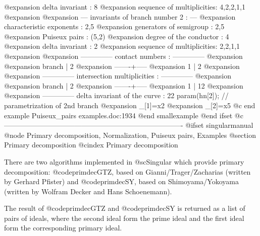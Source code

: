@expansion{}  delta invariant           : 8
@expansion{}  sequence of multiplicities: 4,2,2,1,1
@expansion{} 
@expansion{}  --- invariants of branch number 2 : ---
@expansion{}  characteristic exponents  : 2,5
@expansion{}  generators of semigroup   : 2,5
@expansion{}  Puiseux pairs             : (5,2)
@expansion{}  degree of the conductor   : 4
@expansion{}  delta invariant           : 2
@expansion{}  sequence of multiplicities: 2,2,1,1
@expansion{} 
@expansion{}  -------------- contact numbers : -------------- 
@expansion{} 
@expansion{} branch |    2    
@expansion{} -------+-----
@expansion{}     1  |    2
@expansion{} 
@expansion{}  -------------- intersection multiplicities : -------------- 
@expansion{} 
@expansion{} branch |    2    
@expansion{} -------+-----
@expansion{}     1  |   12
@expansion{} 
@expansion{}  -------------- delta invariant of the curve :  22
  param(hn[2]);      // parametrization of 2nd branch
@expansion{} _[1]=x2
@expansion{} _[2]=x5
@c end example Puiseux_pairs examples.doc:1934
@end smallexample
@end ifset
@c ----------------------------------------------------------------------------
@ifset singularmanual
@node Primary decomposition, Normalization, Puiseux pairs, Examples
@section Primary decomposition
@cindex Primary decomposition

There are two algorithms implemented in @sc{Singular} which provide
primary decomposition: @code{primdecGTZ}, based on
Gianni/Trager/Zacharias (written by Gerhard Pfister) and
@code{primdecSY}, based on Shimoyama/Yokoyama (written by Wolfram Decker
and Hans Schoenemann).

The result of @code{primdecGTZ} and @code{primdecSY} is returned as
a list of pairs of ideals,
where the second ideal form the prime ideal and the first
ideal form the corresponding primary ideal.

